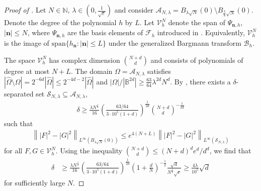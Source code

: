 \documentclass[11pt]{amsart}
\begin{document}
\begin{proof}[Proof of ]
    Let $N \in \mathbb N$, $\lambda \in (0,\frac1{\sqrt e})$ and consider $\mathcal A_{N,\lambda} = B_{\lambda \sqrt{N}}(0) \setminus B_{\frac \lambda 8 \sqrt{N}}(0)$. Denote the degree of the polynomial $h$ by $L$. Let $\mathcal V_h^N$ denote the span of $\Psi_{\mathbf n,h}$, $|\mathbf n| \leq N$, where $\Psi_{\mathbf n,h}$ are the basis elements of $\mathcal F_h$ introduced in . Equivalently, $\mathcal V_h^N$ is the image of $\mathrm{span}\{h_{\mathbf n}: |\mathbf n| \leq L\}$ under the generalized Bargmann transform $\mathcal B_h$.

    The space $\mathcal V^{N}_{h}$ has complex dimension $\binom{N+d}{d}$ and consists of polynomials of degree at most $N+L$. The domain $\Omega = \mathcal A_{N,\lambda}$ satisfies $|\hat{\Omega} \setminus \Omega| = 2^{-6d} |\hat \Omega| \leq 2^{-4d-2} |\hat \Omega|$ and $|\Omega|/|\mathbb B^{2d}| \geq \frac{63}{64} \lambda^{2d}N^{d}$. By , there exists a $\delta$-separated set $\mathcal S_{N,\lambda} \subseteq \mathcal A_{N,\lambda}$,
    \begin{align*}
        \delta \geq \frac{\lambda N^{\frac12}}{16} \left( \frac{63/64}{3\cdot 10^5 (1 + d)} \right)^{\frac1{2d}} \binom{N+d}{d}^{-\frac{1}{2d}}
    \end{align*}
    such that 
    \begin{align}
        \label{eq:norming_applied}
    \left\lVert |F|^2-|G|^2 \right\rVert_{L^\infty(B_{\lambda \sqrt{N}}(0))}
    \le
    e^{4 (N+L)}
    \left\lVert |F|^2-|G|^2 \right\rVert_{L^\infty(\mathcal S_{N,\lambda})}
    \end{align}
    for all $F,G \in \mathcal V^{N}_{h}$. Using the inequality $\binom{N+d}{d} \leq (N+d)^d e^d/d^d$, we find that
    \begin{align*}
        \delta &\geq \frac{\lambda N^{\frac12}}{16} \left( \frac{63/64}{3\cdot 10^5 (1 + d)} \right)^{\frac1{2d}} \left( 1 + \frac{d}{N} \right)^{-\frac12} \frac{\sqrt{d}}{N^{\frac12}\sqrt{e}} \geq \frac{4\lambda}{10^5} \sqrt{d}
    \end{align*}
    for sufficiently large $N$.
    

\end{proof}
\end{document}
